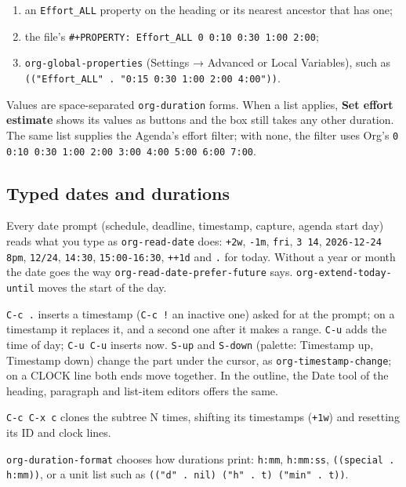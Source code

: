 \documentclass[11pt]{article}
\begin{document}
\begin{enumerate}
\item an \texttt{Effort\_ALL} property on the heading or its nearest ancestor that has one;
\item the file's \texttt{\#+PROPERTY: Effort\_ALL 0 0:10 0:30 1:00 2:00};
\item \texttt{org-global-properties} (Settings → Advanced or Local Variables), such as \texttt{(("Effort\_ALL" . "0:15 0:30 1:00 2:00 4:00"))}.
\end{enumerate}

Values are space-separated \texttt{org-duration} forms. When a list applies, \textbf{Set effort estimate} shows its values as buttons and the box still takes any other duration. The same list supplies the Agenda's effort filter; with none, the filter uses Org's \texttt{0 0:10 0:30 1:00 2:00 3:00 4:00 5:00 6:00 7:00}.

\subsection{Typed dates and durations}
\label{sec:org14be048}
Every date prompt (schedule, deadline, timestamp, capture, agenda start day) reads what you type as \texttt{org-read-date} does: \texttt{+2w}, \texttt{-1m}, \texttt{fri}, \texttt{3 14}, \texttt{2026-12-24 8pm}, \texttt{12/24}, \texttt{14:30}, \texttt{15:00-16:30}, \texttt{++1d} and \texttt{.} for today. Without a year or month the date goes the way \texttt{org-read-date-prefer-future} says. \texttt{org-extend-today-until} moves the start of the day.

\texttt{C-c .} inserts a timestamp (\texttt{C-c !} an inactive one) asked for at the prompt; on a timestamp it replaces it, and a second one after it makes a range. \texttt{C-u} adds the time of day; \texttt{C-u C-u} inserts now. \texttt{S-up} and \texttt{S-down} (palette: Timestamp up, Timestamp down) change the part under the cursor, as \texttt{org-timestamp-change}; on a CLOCK line both ends move together. In the outline, the Date tool of the heading, paragraph and list-item editors offers the same.

\texttt{C-c C-x c} clones the subtree N times, shifting its timestamps (\texttt{+1w}) and resetting its ID and clock lines.

\texttt{org-duration-format} chooses how durations print: \texttt{h:mm}, \texttt{h:mm:ss}, \texttt{((special . h:mm))}, or a unit list such as \texttt{(("d" . nil) ("h" . t) ("min" . t))}.
\end{document}
